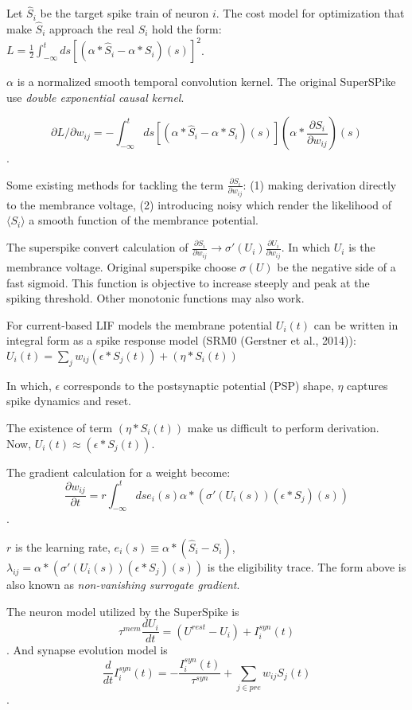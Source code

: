 Let $\hat S_i$ be the target spike train of neuron $i$.
The cost model for optimization that make $\hat S_i$ approach the real $S_i$ hold the form:
$L=\frac12 \int_{-\infty}^t ds[(\alpha * \hat S_i - \alpha * S_i)(s)]^2$.

$\alpha$ is a normalized smooth temporal convolution kernel. The original SuperSPike use 
\textit{double exponential causal kernel}.

$$\partial L/\partial w_{ij}=-\int_{-\infty}^t ds[(\alpha * \hat S_i - \alpha * S_i)(s)](\alpha * \frac{\partial S_i}{\partial w_{ij}})(s)$$.

Some existing methods for tackling the term $\frac{\partial S_i}{\partial w_{ij}}$:
(1) making derivation directly to the membrance voltage, 
(2) introducing noisy which render the likelihood of $\langle S_i \rangle$ a smooth function of the membrance potential.

The superspike convert calculation of $\frac{\partial S_i}{\partial w_{ij}}\rightarrow \sigma'(U_i)\frac{\partial U_i}{\partial w_{ij}}$.
In which $U_i$ is the membrance voltage.
Original superspike choose $\sigma(U)$ be the negative side of a fast sigmoid.
This function is objective to increase steeply and peak at the spiking threshold.
Other monotonic functions may also work.

For current-based LIF models the membrane potential $U_i(t)$ can be written in integral form as 
a spike response model (SRM0 (Gerstner et al., 2014)):
$U_i(t) = \sum_j w_{ij} (\epsilon * S_j(t)) + (\eta * S_i(t))$ 



In which, $\epsilon$ corresponds to the postsynaptic potential (PSP) shape, $\eta$ captures 
spike dynamics and reset.

The existence of term $(\eta * S_i(t))$ make us difficult to perform derivation. Now, 
$U_i(t)\approx (\epsilon * S_j(t))$.

The gradient calculation for a weight become:
$$\frac{\partial w_{ij}}{\partial t}=r\int_{-\infty}^t ds e_i(s) \alpha * (\sigma'(U_i(s))(\epsilon * S_j)(s))$$.

$r$ is the learning rate, $e_i(s)\equiv \alpha * (\hat S_i - S_i)$, $\lambda_{ij} = \alpha * (\sigma'(U_i(s))(\epsilon * S_j)(s))$
 is the eligibility trace. The form above is also known as \textit{non-vanishing surrogate gradient}.

The neuron model utilized by the SuperSpike is $$\tau^{mem}\frac{dU_i}{dt} = (U^{rest} -U_i) +I_i^{syn}(t)$$.
And synapse evolution model is $$\frac{d}{dt} I_i^{syn}(t) =-\frac{I_i^{syn}(t)}{\tau^{syn}} + \sum_{j\in pre}w_{ij}S_j(t)$$.

